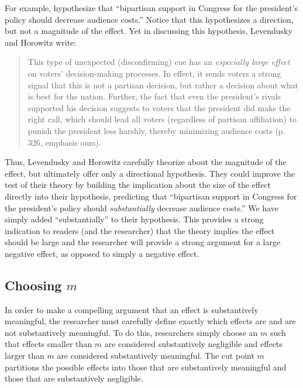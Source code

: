 \documentclass[12pt]{article}
\begin{document}
For example, \cite{LevenduskyHorowitz2012} hypothesize that ``bipartisan support in Congress for the president's policy should decrease audience costs.'' Notice that this hypothesizes a direction, but not a magnitude of the effect. Yet in discussing this hypothesis, Levendusky and Horowitz write: 

\begin{quote}
This type of unexpected (disconfirming) cue has an \emph{especially large effect} on voters' decision-making processes. In effect, it sends voters a strong signal that this is not a partisan decision, but rather a decision about what is best for the nation. Further, the fact that even the president's rivals supported his decision suggests to voters that the president did make the right call, which should lead all voters (regardless of partisan affiliation) to punish the president less harshly, thereby minimizing audience costs (p. 326, emphasis ours).
\end{quote}

\noindent Thus, Levendusky and Horowitz carefully theorize about the magnitude of the effect, but ultimately offer only a directional hypothesis. They could improve the test of their theory by building the implication about the size of the effect directly into their hypothesis, predicting that ``bipartisan support in Congress for the president's policy should \emph{substantially} decrease audience costs.'' We have simply added ``substantially'' to their hypothesis. This provides a strong indication to readers (and the researcher) that the theory implies the effect should be large and the researcher will provide a strong argument for a large negative effect, as opposed to simply a negative effect. 

\subsection*{Choosing $m$}

In order to make a compelling argument that an effect is substantively meaningful, the researcher must carefully define exactly which effects are and are not substantively meaningful. To do this, researchers simply choose an $m$ such that effects smaller than $m$ are considered substantively negligible and effects larger than $m$ are considered substantively meaningful. The cut point $m$ partitions the possible effects into those that are substantively meaningful and those that are substantively negligible.
\end{document}
